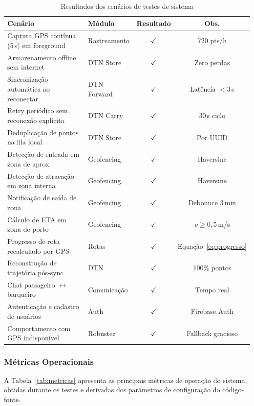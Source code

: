 \documentclass[12pt]{article}
\begin{document}
\begin{table}[H]
\caption{Resultados dos cenários de testes de sistema}
\label{tab:cenarios}
\centering
\renewcommand{\arraystretch}{1.2}
\begin{tabularx}{\textwidth}{Xlcc}
\toprule
\textbf{Cenário} & \textbf{Módulo} & \textbf{Resultado} & \textbf{Obs.} \\
\midrule
Captura GPS contínua (5\,s) em foreground & Rastreamento & $\checkmark$ & 720 pts/h \\
Armazenamento offline sem internet & DTN Store & $\checkmark$ & Zero perdas \\
Sincronização automática ao reconectar & DTN Forward & $\checkmark$ & Latência $<$3\,s \\
Retry periódico sem reconexão explícita & DTN Carry & $\checkmark$ & 30\,s ciclo \\
Deduplicação de pontos na fila local & DTN Store & $\checkmark$ & Por UUID \\
Detecção de entrada em zona de aprox. & Geofencing & $\checkmark$ & Haversine \\
Detecção de atracação em zona interna & Geofencing & $\checkmark$ & Haversine \\
Notificação de saída de zona & Geofencing & $\checkmark$ & Debounce 3\,min \\
Cálculo de ETA em zona de porto & Geofencing & $\checkmark$ & $v \geq 0{,}5$\,m/s \\
Progresso de rota recalculado por GPS & Rotas & $\checkmark$ & Equação~\ref{eq:progresso} \\
Reconstrução de trajetória pós-sync & DTN & $\checkmark$ & 100\% pontos \\
Chat passageiro $\leftrightarrow$ barqueiro & Comunicação & $\checkmark$ & Tempo real \\
Autenticação e cadastro de usuários & Auth & $\checkmark$ & Firebase Auth \\
Comportamento com GPS indisponível & Robustez & $\checkmark$ & Fallback gracioso \\
\bottomrule
\end{tabularx}
\end{table}

\subsubsection{Métricas Operacionais}

A Tabela~\ref{tab:metricas} apresenta as principais métricas de operação do sistema, obtidas durante os testes e derivadas dos parâmetros de configuração do código-fonte.
\end{document}

